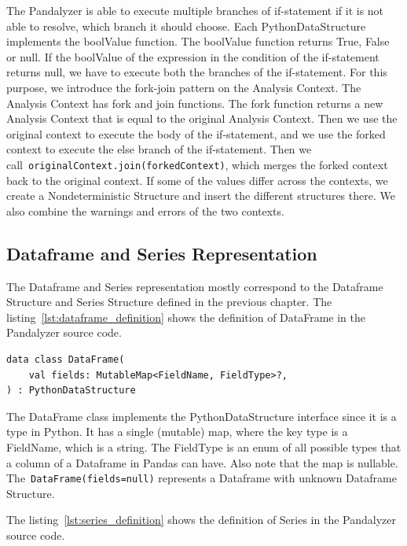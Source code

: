 The Pandalyzer is able to execute multiple branches of if-statement if it is not able to resolve, which branch it should
choose.
Each PythonDataStructure implements the boolValue function.
The boolValue function returns True, False or null.
If the boolValue of the expression in the condition of the if-statement returns null, we have to execute both the
branches of the if-statement.
For this purpose, we introduce the fork-join pattern on the Analysis Context.
The Analysis Context has fork and join functions.
The fork function returns a new Analysis Context that is equal to the original Analysis Context.
Then we use the original context to execute the body of the if-statement, and we use the forked context to execute
the else branch of the if-statement.
Then we call~\verb|originalContext.join(forkedContext)|, which merges the forked context back to the original context.
If some of the values differ across the contexts, we create a Nondeterministic Structure and insert the different
structures there.
We also combine the warnings and errors of the two contexts.

\subsection{Dataframe and Series Representation}\label{subsec:dataframe-and-series-representation}

The Dataframe and Series representation mostly correspond to the Dataframe Structure and Series Structure defined in the
previous chapter.
The listing~\ref{lst:dataframe_definition} shows the definition of DataFrame in the Pandalyzer source code.

\begin{lstlisting}[caption=Kotlin definition of the Dataframe, label={lst:dataframe_definition}, captionpos=b]
data class DataFrame(
    val fields: MutableMap<FieldName, FieldType>?,
) : PythonDataStructure
\end{lstlisting}

The DataFrame class implements the PythonDataStructure interface since it is a type in Python.
It has a single (mutable) map, where the key type is a FieldName, which is a string.
The FieldType is an enum of all possible types that a column of a Dataframe in Pandas can have.
Also note that the map is nullable.
The~\verb|DataFrame(fields=null)| represents a Dataframe with unknown Dataframe Structure.

The listing~\ref{lst:series_definition} shows the definition of Series in the Pandalyzer source code.

